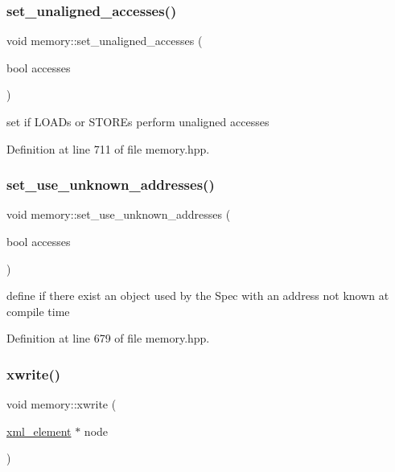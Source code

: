 \subsubsection{\texorpdfstring{set\+\_\+unaligned\+\_\+accesses()}{set\_unaligned\_accesses()}}
{\footnotesize\ttfamily void memory\+::set\+\_\+unaligned\+\_\+accesses (\begin{DoxyParamCaption}\item[{bool}]{accesses }\end{DoxyParamCaption})\hspace{0.3cm}{\ttfamily [inline]}}



set if L\+O\+A\+Ds or S\+T\+O\+R\+Es perform unaligned accesses 



Definition at line 711 of file memory.\+hpp.

\mbox{\label{classmemory_a0f7fcd0b927b352cb590638a3fb20bce}} 
\subsubsection{\texorpdfstring{set\+\_\+use\+\_\+unknown\+\_\+addresses()}{set\_use\_unknown\_addresses()}}
{\footnotesize\ttfamily void memory\+::set\+\_\+use\+\_\+unknown\+\_\+addresses (\begin{DoxyParamCaption}\item[{bool}]{accesses }\end{DoxyParamCaption})\hspace{0.3cm}{\ttfamily [inline]}}



define if there exist an object used by the Spec with an address not known at compile time 



Definition at line 679 of file memory.\+hpp.

\mbox{\label{classmemory_a078583e5743344036f0620cd532d5e89}} 
\subsubsection{\texorpdfstring{xwrite()}{xwrite()}}
{\footnotesize\ttfamily void memory\+::xwrite (\begin{DoxyParamCaption}\item[{\hyperlink{classxml__element}{xml\+\_\+element} $\ast$}]{node }\end{DoxyParamCaption})}



